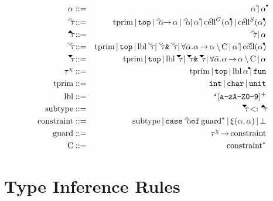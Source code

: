 \documentclass{article}
\begin{document}
\begin{eqnarray*}
    \alpha          &::=&       \alphaOpen
                           \gOr \alphaClosed
\\
    \tauUpOpen      &::=&       \tprim
                           \gOr \gtTop
                           \gOr \alphaUp \fto \alpha
                           \gOr \alphaUp
                           \gOr \alphaOpen
                           \gOr \cellUpG{\alphaClosed}
                           \gOr \cellUpS{\alphaClosed}
\\
    \tauUpClosed    &::=&       \tauUpOpen
                           \gOr \alpha
\\
    \tauDownOpen    &::=&       \tprim
                           \gOr \gtTop
                           \gOr \lbl \tauDownOpen
                           \gOr \tauDownOpen \gtAmp \tauDownOpen
                           \gOr \forall \alphaList. \alpha \fto \alpha \cSeparator \constraintList
                           \gOr \alphaOpen
                           \gOr \cellDown{\alphaClosed}
\\
    \tauDownClosed  &::=&       \tprim
                           \gOr \gtTop
                           \gOr \lbl \tauDownClosed
                           \gOr \tauDownClosed \gtAmp \tauDownClosed
                           \gOr \forall \alphaList. \alpha \fto \alpha \cSeparator \constraintList
                           \gOr \alpha
\\
    \tauChi         &::=&       \tprim
                           \gOr \gtTop
                           \gOr \lbl \alphaClosed
                           \gOr \gtFun
\\
    \tprim          &::=&       \gtInt
                           \gOr \gtChar
                           \gOr \gtUnit
\\
    \lbl            &::=&       \gtBt [\texttt{a-zA-Z0-9}]^+
\\
    \subtype        &::=&       \tauDownClosed <: \tauUpClosed
\\
    \constraint     &::=&       \subtype
                           \gOr \gtCase \alphaUp \gtOf \guard^*
                           \gOr \equatable{\alpha}{\alpha}
                           \gOr \gtBottom
\\
    \guard          &::=&       \tauChi \fto \constraint
\\
    \constraintList &::=&       \constraint^*
\end{eqnarray*}

\section*{Type Inference Rules}
\end{document}
